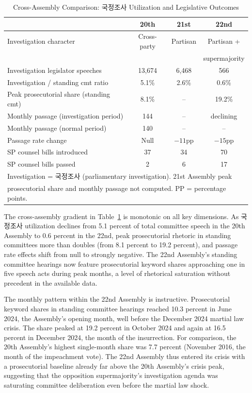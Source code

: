 \documentclass[11pt]{article}
\begin{document}
\begin{table}[htbp]
\centering
\caption{Cross-Assembly Comparison: 국정조사 Utilization and Legislative Outcomes}
\label{tab:crossassembly}
\begin{tabular}{lccc}
\toprule
 & 20th & 21st & 22nd \\
\midrule
Investigation character & Cross-party & Partisan & Partisan + \\
 & & & supermajority \\
Investigation legislator speeches & 13,674 & 6,468 & 566 \\
Investigation / standing cmt ratio & 5.1\% & 2.6\% & 0.6\% \\
Peak prosecutorial share (standing cmt) & 8.1\% & -- & 19.2\% \\
Monthly passage (investigation period) & 144 & -- & declining \\
Monthly passage (normal period) & 140 & -- & -- \\
Passage rate change & Null & $-11$pp & $-15$pp \\
SP counsel bills introduced & 37 & 34 & 70 \\
SP counsel bills passed & 2 & 6 & 17 \\
\bottomrule
\multicolumn{4}{l}{\footnotesize Investigation = 국정조사 (parliamentary investigation). 21st Assembly peak} \\
\multicolumn{4}{l}{\footnotesize prosecutorial share and monthly passage not computed. PP = percentage points.} \\
\end{tabular}
\end{table}

The cross-assembly gradient in Table~\ref{tab:crossassembly} is monotonic on all key dimensions. As 국정조사 utilization declines from 5.1 percent of total committee speech in the 20th Assembly to 0.6 percent in the 22nd, peak prosecutorial rhetoric in standing committees more than doubles (from 8.1 percent to 19.2 percent), and passage rate effects shift from null to strongly negative. The 22nd Assembly's standing committee hearings now feature prosecutorial keyword shares approaching one in five speech acts during peak months, a level of rhetorical saturation without precedent in the available data.

The monthly pattern within the 22nd Assembly is instructive. Prosecutorial keyword shares in standing committee hearings reached 10.3 percent in June 2024, the Assembly's opening month, well before the December 2024 martial law crisis. The share peaked at 19.2 percent in October 2024 and again at 16.5 percent in December 2024, the month of the insurrection. For comparison, the 20th Assembly's highest single-month share was 7.7 percent (November 2016, the month of the impeachment vote). The 22nd Assembly thus entered its crisis with a prosecutorial baseline already far above the 20th Assembly's crisis peak, suggesting that the opposition supermajority's investigation agenda was saturating committee deliberation even before the martial law shock.
\end{document}
